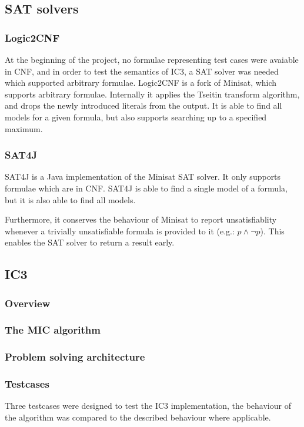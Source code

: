 \documentclass[a4paper]{article}
\begin{document}
\subsection{SAT solvers}
\subsubsection{Logic2CNF}
At the beginning of the project, no formulae representing test cases were avaiable in CNF, and in order to test the semantics of IC3, a SAT solver was needed which supported arbitrary formulae. Logic2CNF is a fork of Minisat, which supports arbitrary formulae. Internally it applies the Tseitin transform algorithm, and drops the newly introduced literals from the output. It is able to find all models for a given formula, but also supports searching up to a specified maximum.

\subsubsection{SAT4J}
SAT4J is a Java implementation of the Minisat SAT solver. It only supports formulae which are in CNF. SAT4J is able to find a single model of a formula, but it is also able to find all models.

Furthermore, it conserves the behaviour of Minisat to report unsatisfiablity whenever a trivially unsatisfiable formula is provided to it (e.g.: $p \land \lnot p$). This enables the SAT solver to return a result early.

\subsection{IC3}
\subsubsection{Overview}
\subsubsection{The MIC algorithm}
\subsubsection{Problem solving architecture}
\subsubsection{Testcases}
Three testcases were designed to test the IC3 implementation, the behaviour of the algorithm was compared to the described behaviour where applicable.
\end{document}
